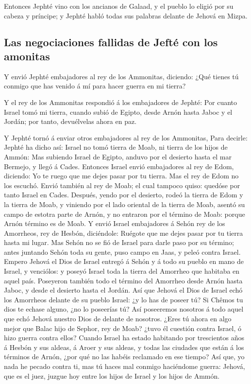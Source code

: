  Entonces Jephté vino con los ancianos de Galaad, y el
pueblo lo eligió por su cabeza y príncipe; y Jephté habló todas sus
palabras delante de Jehová en Mizpa.

\hypertarget{las-negociaciones-fallidas-de-jeftuxe9-con-los-amonitas}{%
\subsection{Las negociaciones fallidas de Jefté con los
amonitas}\label{las-negociaciones-fallidas-de-jeftuxe9-con-los-amonitas}}

 Y envió Jephté embajadores al rey de los Ammonitas,
diciendo: ¿Qué tienes tú conmigo que has venido á mí para hacer guerra
en mi tierra?

 Y el rey de los Ammonitas respondió á los embajadores de
Jephté: Por cuanto Israel tomó mi tierra, cuando subió de Egipto, desde
Arnón hasta Jaboc y el Jordán; por tanto, devuélvelas ahora en paz.

 Y Jephté tornó á enviar otros embajadores al rey de los
Ammonitas,  Para decirle: Jephté ha dicho así: Israel no
tomó tierra de Moab, ni tierra de los hijos de Ammón: 
Mas subiendo Israel de Egipto, anduvo por el desierto hasta el mar
Bermejo, y llegó á Cades.  Entonces Israel envió
embajadores al rey de Edom, diciendo: Yo te ruego que me dejes pasar por
tu tierra. Mas el rey de Edom no los escuchó. Envió también al rey de
Moab; el cual tampoco quiso: quedóse por tanto Israel en Cades.
 Después, yendo por el desierto, rodeó la tierra de Edom
y la tierra de Moab, y viniendo por el lado oriental de la tierra de
Moab, asentó su campo de estotra parte de Arnón, y no entraron por el
término de Moab: porque Arnón término es de Moab.  Y
envió Israel embajadores á Sehón rey de los Amorrheos, rey de Hesbón,
diciéndole: Ruégote que me dejes pasar por tu tierra hasta mi lugar.
 Mas Sehón no se fió de Israel para darle paso por su
término; antes juntando Sehón toda su gente, puso campo en Jaas, y peleó
contra Israel.  Empero Jehová el Dios de Israel entregó á
Sehón y á todo su pueblo en mano de Israel, y venciólos: y poseyó Israel
toda la tierra del Amorrheo que habitaba en aquel país. 
Poseyeron también todo el término del Amorrheo desde Arnón hasta Jaboc,
y desde el desierto hasta el Jordán.  Así que Jehová el
Dios de Israel echó los Amorrheos delante de su pueblo Israel: ¿y lo has
de poseer tú?  Si Chêmos tu dios te echase alguno, ¿no lo
poseerías tú? Así poseeremos nosotros á todo aquel que echó Jehová
nuestro Dios de delante de nosotros.  ¿Eres tú ahora en
algo mejor que Balac hijo de Sephor, rey de Moab? ¿tuvo él cuestión
contra Israel, ó hizo guerra contra ellos?  Cuando Israel
ha estado habitando por trescientos años á Hesbón y sus aldeas, á Aroer
y sus aldeas, y todas las ciudades que están á los términos de Arnón,
¿por qué no las habéis reclamado en ese tiempo?  Así que,
yo nada he pecado contra ti, mas tú haces mal conmigo haciéndome guerra:
Jehová, que es el juez, juzgue hoy entre los hijos de Israel y los hijos
de Ammón.

